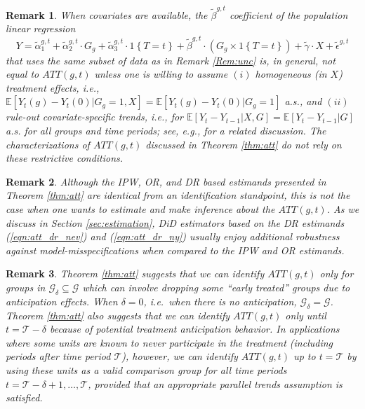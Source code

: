\documentclass[11pt]{article}%
\theoremstyle{plain}
\newtheorem{remark}{Remark}
\numberwithin{sassumption}{section}
\numberwithin{equation}{section}
\begin{document}
\begin{remark}
When covariates are available, the $\tilde{\beta}^{g,t}$ coefficient of the
population linear regression%
\[
Y=\tilde{\alpha}_{1}^{g,t}+\tilde{\alpha}_{2}^{g,t}\cdot G_{g}+\tilde{\alpha
}_{3}^{g,t}\cdot1\left\{  T=t\right\}  +\tilde{\beta}^{g,t}\cdot\left(
G_{g}\times1\left\{  T=t\right\}  \right)  +\tilde{\gamma}\cdot X+\tilde
{\epsilon}^{g,t}%
\]
that uses the same subset of data as in Remark \ref{Rem:unc} is, in general,
not equal to $ATT\left(  g,t\right)  $ unless one is willing to assume
$\left(  i\right)  $ homogeneous (in $X$) treatment effects, i.e.,
$\mathbb{E}[Y_{t}(g)-Y_{t}(0)|G_{g}=1,X]=\mathbb{E}[Y_{t}(g)-Y_{t}%
(0)|G_{g}=1]$ a.s., and $\left(  ii\right)  $ rule-out covariate-specific
trends, i.e., for $\mathbb{E}\left[  Y_{t}-Y_{t-1}|X,G\right]  =\mathbb{E}%
[Y_{t}-Y_{t-1}|G]$ a.s. for all groups and time periods; see, e.g.,
\cite{sloczynski-2018} for a related discussion. The characterizations of
$ATT\left(  g,t\right)  $ discussed in Theorem \ref{thm:att} do not rely on
these restrictive conditions.
\end{remark}

\begin{remark}
Although the IPW, OR, and DR based estimands presented in Theorem \ref{thm:att}
are identical from an identification standpoint, this is not the case when one
wants to estimate and make inference about the $ATT\left(  g,t\right)  $. As
we discuss in Section \ref{sec:estimation}, DiD  estimators based on the DR
estimands (\ref{eqn:att_dr_nev}) and (\ref{eqn:att_dr_ny}) usually enjoy
additional robustness against model-misspecifications when compared to the IPW
and OR estimands.
\end{remark}

\begin{remark}
Theorem \ref{thm:att} suggests that we can identify $ATT(g,t)$ only for groups in $\mathcal{G}_\delta \subseteq \mathcal{G}$ which can involve dropping some ``early treated'' groups due to anticipation effects.  When $\delta=0$, i.e.\ when there is no anticipation, $\mathcal{G}_\delta = \mathcal{G}$.  Theorem \ref{thm:att} also suggests that we can identify $ATT\left(  g,t\right)  $
only until $t=\mathcal{T}-\delta$ because of potential treatment anticipation
behavior. In applications {where some units are known to never participate in
the treatment (including periods after time period $\mathcal{T}$),} however,
we can identify $ATT(g,t)$ up to $t=\mathcal{T}$ by using these units as a
valid comparison group for all time periods $t=\mathcal{T}-\delta
+1,\dots,\mathcal{T}$, provided that an appropriate parallel trends assumption
is satisfied.
\end{remark}
\end{document}
